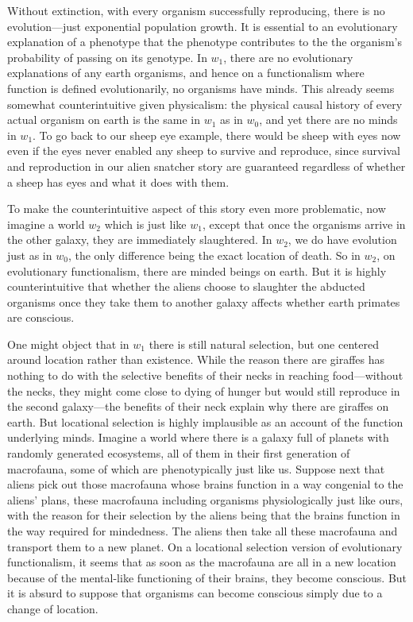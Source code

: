 Without extinction, with every organism successfully reproducing, there is no evolution---just exponential population
growth. It is essential to an evolutionary explanation of a phenotype that the phenotype contributes to the the organism's 
probability of passing on its genotype. In $w_1$, there are no evolutionary explanations of any earth organisms, and 
hence on a functionalism where function is defined evolutionarily, no organisms have minds. This already seems somewhat
counterintuitive given physicalism: the physical causal history of every actual organism on earth is the same in $w_1$ 
as in $w_0$, and yet there are no minds in $w_1$. To go back to our sheep eye example, there would be sheep with eyes now
even if the eyes never enabled any sheep to survive and reproduce, since survival and reproduction in our alien snatcher 
story are guaranteed regardless of whether a sheep has eyes and what it does with them.

To make the counterintuitive aspect of this story even more problematic, now imagine a world $w_2$ which is just like 
$w_1$, except that once the organisms arrive in the other galaxy, they are immediately slaughtered. In $w_2$, we do have
evolution just as in $w_0$, the only difference being the exact location of death. So in $w_2$, on evolutionary functionalism,
there are minded beings on earth. But it is highly counterintuitive that whether the aliens choose to slaughter the 
abducted organisms once they take them to another galaxy affects whether earth primates are conscious.

One might object that in $w_1$ there is still natural selection, but one centered around location rather than 
existence. While the reason there are giraffes has nothing to do with the selective benefits of their necks in 
reaching food---without the necks, they might come close to dying of hunger but would still reproduce in the second 
galaxy---the benefits of their neck explain why there are giraffes on earth. But locational selection is highly
implausible as an account of the function underlying minds. Imagine a world where there is a galaxy full of planets
with randomly generated ecosystems, all of them in their first generation of macrofauna, some of which are 
phenotypically just like us. Suppose next that aliens pick out those macrofauna whose brains function in a way 
congenial to the aliens' plans, these macrofauna including organisms physiologically just like ours, with the 
reason for their selection by the aliens being that the brains function in the way required for mindedness. 
The aliens then take all these macrofauna and transport them to a new planet. On a locational selection version 
of evolutionary functionalism, it seems that as soon as the macrofauna are all in a new location because of the 
mental-like functioning of their brains, they become conscious. But it is absurd to suppose that organisms can 
become conscious simply due to a change of location. 

